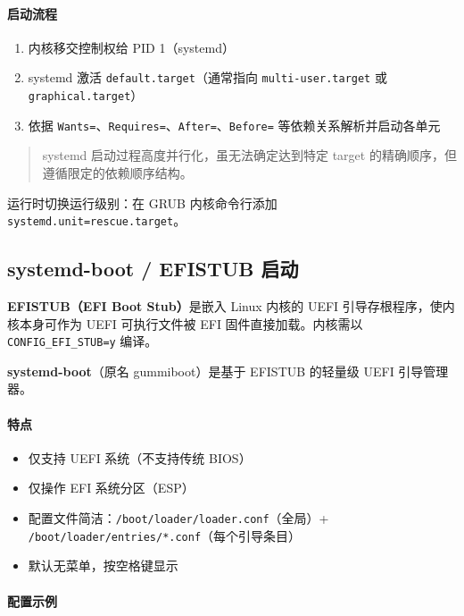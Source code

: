\documentclass[12pt,UTF8]{ctexbook}
\begin{document}
\paragraph{启动流程}

\begin{enumerate}
	\item 内核移交控制权给 PID 1（systemd）
	\item systemd 激活 \texttt{default.target}（通常指向 \texttt{multi-user.target} 或 \texttt{graphical.target}）
	\item 依据 \texttt{Wants=}、\texttt{Requires=}、\texttt{After=}、\texttt{Before=} 等依赖关系解析并启动各单元
\end{enumerate}
	
\begin{quote}
	systemd 启动过程高度并行化，虽无法确定达到特定 target 的精确顺序，但遵循限定的依赖顺序结构。
\end{quote}
	
运行时切换运行级别：在 GRUB 内核命令行添加 \texttt{systemd.unit=rescue.target}。
	
\subsection{systemd-boot / EFISTUB 启动}
	
\textbf{EFISTUB（EFI Boot Stub）}是嵌入 Linux 内核的 UEFI 引导存根程序，使内核本身可作为 UEFI 可执行文件被 EFI 固件直接加载。内核需以 \texttt{CONFIG\_EFI\_STUB=y} 编译。
	
\textbf{systemd-boot}（原名 gummiboot）是基于 EFISTUB 的轻量级 UEFI 引导管理器。
	
\paragraph{特点}

\begin{itemize}
	\item 仅支持 UEFI 系统（不支持传统 BIOS）
	\item 仅操作 EFI 系统分区（ESP）
	\item 配置文件简洁：\texttt{/boot/loader/loader.conf}（全局）+ \texttt{/boot/loader/entries/*.conf}（每个引导条目）
	\item 默认无菜单，按空格键显示
\end{itemize}
	
\paragraph{配置示例}
\end{document}
